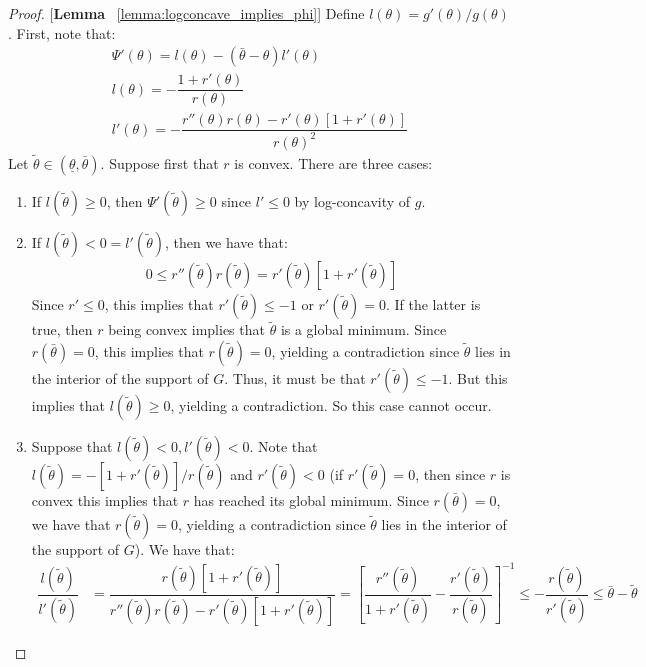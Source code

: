 \begin{proof}{[\textbf{Lemma} ~\ref{lemma:logconcave_implies_phi}]} Define $l(\theta) = g'(\theta)/g(\theta)$. First, note that:
\begin{gather*}
  \Psi'(\theta) = l(\theta) - (\bar{\theta}-\theta)l'(\theta) \\
  l(\theta) = -\dfrac{1+r'(\theta)}{r(\theta)} \\ 
  l'(\theta) = -\dfrac{r''(\theta)r(\theta) - r'(\theta)[1+r'(\theta)]}{r(\theta)^2}
\end{gather*}
Let $\tilde{\theta}\in(\underline{\theta},\bar{\theta})$. Suppose first that $r$ is convex. There are three cases:
\vspace{-5pt}
\begin{enumerate}[label=(\arabic*),ref=\thelemma(\arabic*)]
   \item If $l(\tilde{\theta})\geq 0$, then $\Psi'(\tilde{\theta})\geq0$ since $l'\leq 0$ by log-concavity of $g$. 
   \item If $l(\tilde{\theta})<0 = l'(\tilde{\theta})$, then we have that:
   \begin{align*}
    0\leq r''(\tilde{\theta})r(\tilde{\theta}) = r'(\tilde{\theta})[1+r'(\tilde{\theta})]
   \end{align*}
   Since $r'\leq 0$, this implies that $r'(\tilde{\theta})\leq -1$ or $r'(\tilde{\theta})=0$. If the latter is true, then $r$ being convex implies that $\tilde{\theta}$ is a global minimum. Since $r(\bar{\theta}) = 0$, this implies that $r(\tilde{\theta})=0$, yielding a contradiction since $\tilde{\theta}$ lies in the interior of the support of $G$. Thus, it must be that $r'(\tilde{\theta})\leq -1$. But this implies that $l(\tilde{\theta})\geq 0$, yielding a contradiction. So this case cannot occur. 
   \item Suppose that $l(\tilde{\theta})<0,l'(\tilde{\theta})<0$. Note that $l(\tilde{\theta}) = -[1+r'(\tilde{\theta})]/r(\tilde{\theta})$ and $r'(\tilde{\theta})<0$ (if $r'(\tilde{\theta})=0$, then since $r$ is convex this implies that $r$ has reached its global minimum. Since $r(\bar{\theta})=0$, we have that $r(\tilde{\theta})=0$, yielding a contradiction since $\tilde{\theta}$ lies in the interior of the support of $G$). We have that:
   \begin{align*}
    \dfrac{l(\tilde{\theta})}{l'(\tilde{\theta})} &= \dfrac{r(\tilde{\theta})[1+r'(\tilde{\theta})]}{r''(\tilde{\theta})r(\tilde{\theta}) - r'(\tilde{\theta})[1+r'(\tilde{\theta})]} = \left[\dfrac{r''(\tilde{\theta})}{1+r'(\tilde{\theta})} - \dfrac{r'(\tilde{\theta})}{r(\tilde{\theta})}\right]^{-1} \leq -\dfrac{r(\tilde{\theta})}{r'(\tilde{\theta})} \leq \bar{\theta}-\tilde{\theta}

\end{align*}
\end{enumerate}
\end{proof}
